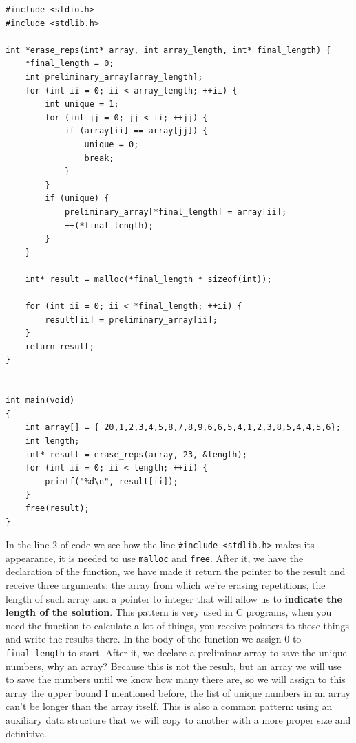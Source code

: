 \documentclass[a4paper]{article}
\begin{document}
\noindent
\begin{minipage}[H]{\linewidth}
\mbox{}
\begin{lstlisting}[style=C, label={lst:mallocAndFree},
caption={Example of dynamic allocation}]
#include <stdio.h>
#include <stdlib.h>

int *erase_reps(int* array, int array_length, int* final_length) {
    *final_length = 0;
    int preliminary_array[array_length];
    for (int ii = 0; ii < array_length; ++ii) {
        int unique = 1;
        for (int jj = 0; jj < ii; ++jj) {
            if (array[ii] == array[jj]) {
                unique = 0;
                break;
            }
        }
        if (unique) {
            preliminary_array[*final_length] = array[ii];
            ++(*final_length);
        }
    }

    int* result = malloc(*final_length * sizeof(int));

    for (int ii = 0; ii < *final_length; ++ii) {
        result[ii] = preliminary_array[ii];
    }
    return result;
}


int main(void)
{
    int array[] = { 20,1,2,3,4,5,8,7,8,9,6,6,5,4,1,2,3,8,5,4,4,5,6};
    int length;
    int* result = erase_reps(array, 23, &length);
    for (int ii = 0; ii < length; ++ii) {
        printf("%d\n", result[ii]);
    }
    free(result);
}
\end{lstlisting}
\end{minipage}

In the line 2 of code we see how the line \verb!#include <stdlib.h>! makes its
appearance, it is needed to use \verb!malloc! and \verb!free!. After it, we have
the declaration of the function, we have made it return the pointer to the
result and receive three arguments: the array from which we're erasing
repetitions, the length of such array and a pointer to integer that will allow
us to \textbf{indicate the length of the solution}. This pattern is very used in
C programs, when you need the function to calculate a lot of things, you receive
pointers to those things and write the results there. In the body of the
function we assign 0 to \verb!final_length! to start. After it, we declare a
preliminar array to save the unique numbers, why an array? Because this is not
the result, but an array we will use to save the numbers until we know how many
there are, so we will assign to this array the upper bound I mentioned before,
the list of unique numbers in an array can't be longer than the array itself.
This is also a common pattern: using an auxiliary data structure that we will
copy to another with a more proper size and definitive.
\end{document}

